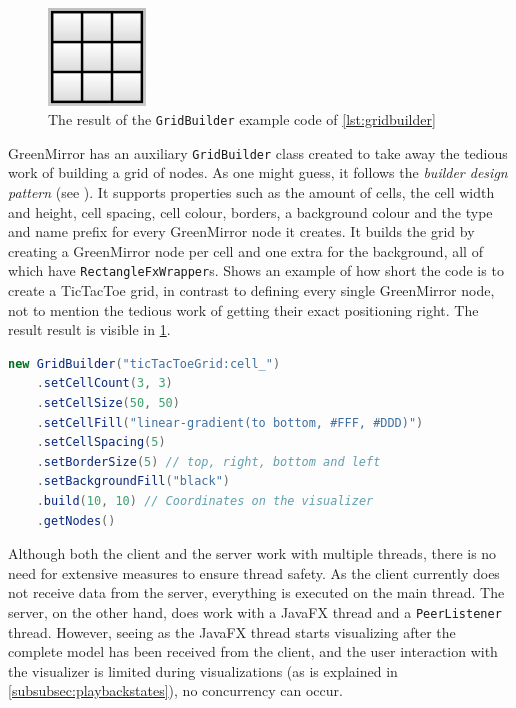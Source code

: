 \documentclass[a4paper]{article}
\begin{document}
\begin{figure}\vspace{-22pt}
  \begin{center}
    \includegraphics[width=0.23\textwidth]{images/grid}
  \end{center}
  \vspace{-10pt}\caption{The result of the \lstinline{GridBuilder} example code of \cref{lst:gridbuilder}}\vspace{-20pt}
  \label{fig:grid}
\end{figure}
GreenMirror has an auxiliary \lstinline{GridBuilder} class created to take away the tedious work of building a grid of nodes. As one might guess, it follows the \emph{builder design pattern} (see \cite{kuchana2004,sourcemaking}). It supports properties such as the amount of cells, the cell width and height, cell spacing, cell colour, borders, a background colour and the type and name prefix for every GreenMirror node it creates. It builds the grid by creating a GreenMirror node per cell and one extra for the background, all of which have \lstinline{RectangleFxWrapper}s.  Shows an example of how short the code is to create a TicTacToe grid, in contrast to defining every single GreenMirror node, not to mention the tedious work of getting their exact positioning right. The result result is visible in \cref{fig:grid}.
\begin{lstlisting}[language=Java, label={lst:gridbuilder}, caption={Example code to build a grid of nodes}]
new GridBuilder("ticTacToeGrid:cell_")
    .setCellCount(3, 3)
    .setCellSize(50, 50)
    .setCellFill("linear-gradient(to bottom, #FFF, #DDD)")
    .setCellSpacing(5)
    .setBorderSize(5) // top, right, bottom and left
    .setBackgroundFill("black")
    .build(10, 10) // Coordinates on the visualizer
    .getNodes()
\end{lstlisting}

Although both the client and the server work with multiple threads, there is no need for extensive measures to ensure thread safety. As the client currently does not receive data from the server, everything is executed on the main thread. The server, on the other hand, does work with a JavaFX thread and a \lstinline{PeerListener} thread. However, seeing as the JavaFX thread starts visualizing after the complete model has been received from the client, and the user interaction with the visualizer is limited during visualizations (as is explained in \cref{subsubsec:playbackstates}), no concurrency can occur.
\end{document}
